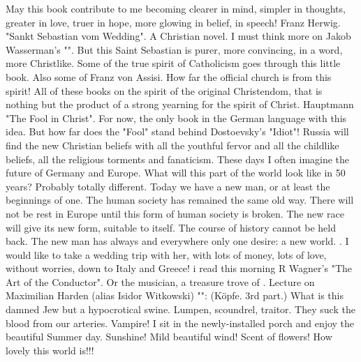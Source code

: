 
May this book contribute to me becoming clearer in mind, simpler in thoughts, greater in love, truer in hope, more glowing in belief,  in speech! Franz Herwig. "Sankt Sebastian vom Wedding". A Christian novel. I must think more on Jakob Wasserman's "". But this Saint Sebastian is purer, more convincing, in a word, more Christlike. Some of the true spirit of Catholicism goes through this little book. Also some of Franz von Assisi. How far the official church is from this spirit! All of these books on the spirit of the original Christendom, that is nothing but the product of a strong yearning for the spirit of Christ. Hauptmann "The Fool in Christ". For now, the only book in the German language with this idea. But how far does the "Fool" stand behind Dostoevsky's "Idiot"! Russia will find the new Christian beliefs with all the youthful fervor and all the childlike beliefs, all the religious torments and fanaticism. These days I often imagine the future of Germany and Europe. What will this part of the world look like in 50 years? Probably totally different. Today we have a new man, or at least the beginnings of one. The human society has remained the same old way. There will not be rest in Europe until this form of human society is broken. The new race will give its new form, suitable to itself. The course of history cannot be held back. The new man has always and everywhere only one desire: a new world. . I would like to take a wedding trip with her, with lots of money, lots of love, without worries, down to Italy and Greece! i read this morning R Wagner's "The Art of the Conductor". Or the musician, a treasure trove of . Lecture on Maximilian Harden (alias Isidor Witkowski) "": (Köpfe. 3rd part.) What is this damned Jew but a hypocrotical swine. Lumpen, scoundrel, traitor. They suck the blood from our arteries. Vampire! I sit in the newly-installed porch and enjoy the beautiful Summer day. Sunshine! Mild beautiful wind! Scent of flowers! How lovely this world is!!!
